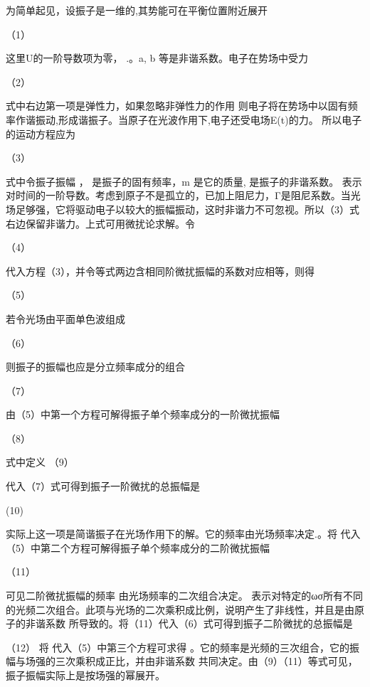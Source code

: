 为简单起见，设振子是一维的,其势能可在平衡位置附近展开

                （1）          

这里U的一阶导数项为零， .。a, b 等是非谐系数。电子在势场中受力

                 （2）           

式中右边第一项是弹性力，如果忽略非弹性力的作用 则电子将在势场中以固有频率作谐振动,形成谐振子。当原子在光波作用下,电子还受电场E(t)的力。  所以电子的运动方程应为

                          （3）       

式中令振子振幅 ，  是振子的固有频率，m 是它的质量,  是振子的非谐系数。  表示对时间的一阶导数。考虑到原子不是孤立的，已加上阻尼力，Γ是阻尼系数。当光场足够强，它将驱动电子以较大的振幅振动，这时非谐力不可忽视。所以（3）式右边保留非谐力。上式可用微扰论求解。令

                                        （4）

代入方程（3），并令等式两边含相同阶微扰振幅的系数对应相等，则得

                         （5）

若令光场由平面单色波组成

                                            （6）

则振子的振幅也应是分立频率成分的组合

                    （7）

由（5）中第一个方程可解得振子单个频率成分的一阶微扰振幅

                          （8）          

式中定义                                          （9）

代入（7）式可得到振子一阶微扰的总振幅是

                                             (10)

实际上这一项是简谐振子在光场作用下的解。它的频率由光场频率决定.。将 代入（5）中第二个方程可解得振子单个频率成分的二阶微扰振幅

                （11）   
                                       
可见二阶微扰振幅的频率 由光场频率的二次组合决定。 表示对特定的ωσ所有不同的光频二次组合。此项与光场的二次乘积成比例，说明产生了非线性，并且是由原子的非谐系数 所导致的。将（11）代入（6）式可得到振子二阶微扰的总振幅是

                                   （12）     
将 代入（5）中第三个方程可求得 。它的频率是光频的三次组合，它的振幅与场强的三次乘积成正比，并由非谐系数 共同决定。由（9）（11）等式可见，振子振幅实际上是按场强的幂展开。

